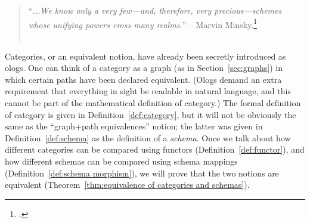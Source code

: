 \documentclass[CT4S-EN-RU]{subfiles}
\begin{document}
\section*{}

\begin{blockENG}
\begin{quote}
“{\it ...We know only a very few—and, therefore, very precious—schemes whose unifying powers cross many realms.}” -- Marvin Minsky.\footnote{\cite[Problems of disunity, p. 126]{Min}.}\\\\
\end{quote}
\end{blockENG}

\begin{blockRUS}
\end{blockRUS}

\begin{blockENG}
Categories, or an equivalent notion, have already been secretly introduced as ologs. One can think of a category as a graph (as in Section~\ref{sec:graphs}) in which certain paths have been declared equivalent. (Ologs demand an extra requirement that everything in sight be readable in natural language, and this cannot be part of the mathematical definition of category.) The formal definition of category is given in Definition~\ref{def:category}, but it will not be obviously the same as the “graph+path equivalences” notion; the latter was given in Definition~\ref{def:schema} as the definition of a {\em schema}. Once we talk about how different categories can be compared using functors (Definition~\ref{def:functor}), and how different schemas can be compared using schema mappings (Definition~\ref{def:schema morphism}), we will prove that the two notions are equivalent (Theorem~\ref{thm:equivalence of categories and schemas}).
\end{blockENG}
\end{document}
